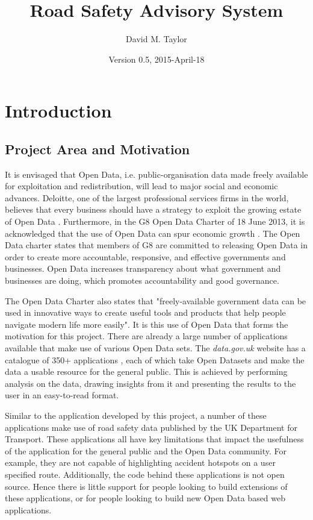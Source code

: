 \documentclass[authoryearcitations]{UoYCSproject}
\author{David M. Taylor}
\title{Road Safety Advisory System}
\date{Version 0.5, 2015-April-18}
\begin{document}
\maketitle
\listoffigures
\listoftables
\renewcommand*{\lstlistlistingname}{List of Listings}
\lstlistoflistings

\cleardoublepage
\label{sec:start}
\thispagestyle{empty}\cleardoublepage

\chapter{Introduction}

\section{Project Area and Motivation}

It is envisaged that Open Data, i.e. public-organisation data made freely available for exploitation and redistribution, will lead to major social and economic advances. Deloitte, one of the largest professional services firms in the world, believes that every business should have a strategy to exploit the growing estate of Open Data \citep{DeloitteAnalytics2012}. Furthermore, in the G8 Open Data Charter of 18 June 2013, it is acknowledged that the use of Open Data can spur economic growth \citep{CabinetOffice2013}. The Open Data charter states that members of G8 are committed to releasing Open Data in order to create more accountable, responsive, and effective governments and businesses. Open Data increases transparency about what government and businesses are doing, which promotes accountability and good governance.

The Open Data Charter also states that "freely-available government data can be used in innovative ways to create useful tools and products that help people navigate modern life more easily". It is this use of Open Data that forms the motivation for this project. There are already a large number of applications available that make use of various Open Data sets. The \textit{data.gov.uk} website has a catalogue of 350+ applications \citep{Data.go}, each of which take Open Datasets and make the data a usable resource for the general public. This is achieved by performing analysis on the data, drawing insights from it and presenting the results to the user in an easy-to-read format. 

Similar to the application developed by this project, a number of these applications make use of road safety data published by the UK Department for Transport. These applications all have key limitations that impact the usefulness of the application for the general public and the Open Data community. For example, they are not capable of highlighting accident hotspots on a user specified route. Additionally, the code behind these applications is not open source. Hence there is little support for people looking to build extensions of these applications, or for people looking to build new Open Data based web applications.
\end{document}
